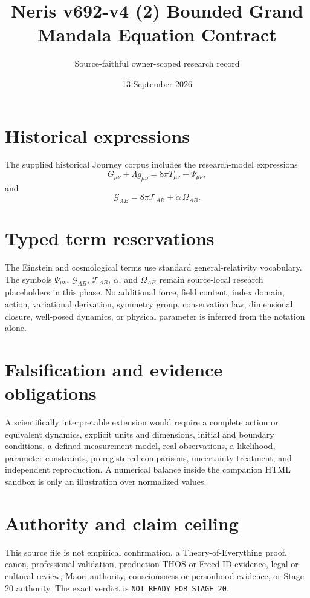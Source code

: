 \documentclass[11pt]{article}
\title{Neris v692-v4 (2) Bounded Grand Mandala Equation Contract}
\author{Source-faithful owner-scoped research record}
\date{13 September 2026}
\begin{document}
\maketitle

\section{Historical expressions}
The supplied historical Journey corpus includes the research-model expressions
\begin{equation}
G_{\mu\nu}+\Lambda g_{\mu\nu}=8\pi T_{\mu\nu}+\Psi_{\mu\nu},
\end{equation}
and
\begin{equation}
\mathcal{G}_{AB}=8\pi\mathcal{T}_{AB}+\alpha\,\Omega_{AB}.
\end{equation}

\section{Typed term reservations}
The Einstein and cosmological terms use standard general-relativity vocabulary. The
symbols $\Psi_{\mu\nu}$, $\mathcal{G}_{AB}$, $\mathcal{T}_{AB}$, $\alpha$, and
$\Omega_{AB}$ remain source-local research placeholders in this phase. No additional
force, field content, index domain, action, variational derivation, symmetry group,
conservation law, dimensional closure, well-posed dynamics, or physical parameter is
inferred from the notation alone.

\section{Falsification and evidence obligations}
A scientifically interpretable extension would require a complete action or equivalent
dynamics, explicit units and dimensions, initial and boundary conditions, a defined
measurement model, real observations, a likelihood, parameter constraints, preregistered
comparisons, uncertainty treatment, and independent reproduction. A numerical balance
inside the companion HTML sandbox is only an illustration over normalized values.

\section{Authority and claim ceiling}
This source file is not empirical confirmation, a Theory-of-Everything proof, canon,
professional validation, production THOS or Freed ID evidence, legal or cultural review,
Maori authority, consciousness or personhood evidence, or Stage 20 authority. The exact
verdict is \texttt{NOT\_READY\_FOR\_STAGE\_20}.
\end{document}
